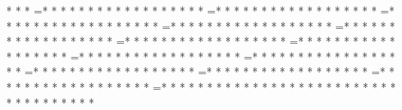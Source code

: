 * *  * =* * *  * * *  * * *  *  * * *  *  * * *  * =* * *  * * *  * * *  *  * * *  *  * * *  * =* * *  * * *  * * *  *  * * *  *  * * *  * =* * *  * * *  * * *  *  * * *  *  * * *  * =* * *  * * *  * * *  *  * * *  *  * * *  * =* * *  * * *  * * *  *  * * *  *  * * *  * =* * *  * * *  * * *  *  * * *  *  * * *  * =* * *  * * *  * * *  *  * * *  *  * * *  * =* * *  * * *  * * *  *  * * *  *  * * *  * =* * *  * * *  * * *  *  * * *  *  * * *  * =* * *  * * *  * * *  *  * * *  *  * * *  * =* * *  * * *  * * *  *  * * *  *  * * *  * =* * *  * * *  * * *  *  * * *  *  * * *  *  * * *  * * *  * * *  *  * * *  *  * * *  * %
